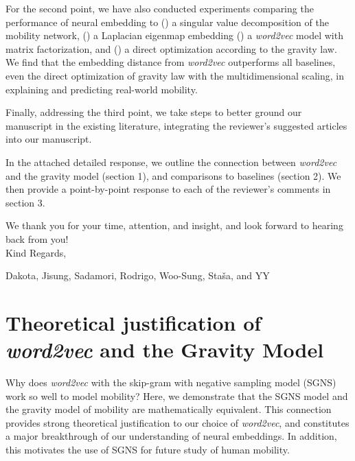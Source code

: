 \documentclass[12pt,a4paper]{article}
\begin{document}
For the second point, we have also conducted experiments comparing the performance of neural embedding to () a singular value decomposition of the mobility network,  () a Laplacian eigenmap embedding  () a \textit{word2vec} model with matrix factorization,  and  () a direct optimization according to the gravity law. We find that the embedding distance from \textit{word2vec} outperforms all baselines, even the direct optimization of gravity law with the multidimensional scaling, in explaining and predicting real-world mobility.

Finally, addressing the third point, we take steps to better ground our manuscript in the existing literature, integrating the reviewer's suggested articles into our manuscript.

In the attached detailed response, we outline the connection between \textit{word2vec} and the gravity model (section 1), and comparisons to baselines (section 2). We then provide a point-by-point response to each of the reviewer's comments in section 3.

We thank you for your time, attention, and insight, and look forward to hearing back from you!\\

Kind Regards,

Dakota, Jisung, Sadamori, Rodrigo, Woo-Sung, Staša, and YY

\clearpage
{}
\setcounter{page}{1}
\tableofcontents
\clearpage


\section{Theoretical justification of \textit{word2vec} and the Gravity Model}
\label{sec:theory}
Why does \textit{word2vec} with the skip-gram with negative sampling model (SGNS) work so well to model mobility?
Here, we demonstrate that the SGNS model and the gravity model of mobility are mathematically equivalent.
This connection provides strong theoretical justification to our choice of \textit{word2vec}, and constitutes a major breakthrough of our understanding of neural embeddings.
In addition, this motivates the use of SGNS for future study of human mobility.
\end{document}
